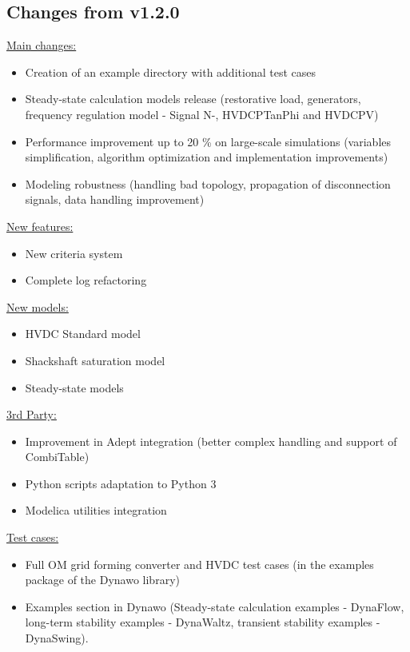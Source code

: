 \documentclass[a4paper, 12pt]{report}
\begin{document}
\subsection{Changes from v1.2.0}

\underline{Main changes:}
\begin{itemize}
\item Creation of an example directory with additional test cases
\item Steady-state calculation models release (restorative load, generators, frequency regulation model - Signal N-, HVDCPTanPhi and HVDCPV)
\item Performance improvement up to 20 \% on large-scale simulations (variables simplification, algorithm optimization and implementation improvements)
\item Modeling robustness (handling bad topology, propagation of disconnection signals, data handling improvement)
\end{itemize}

\underline{New features:}
\begin{itemize}
\item New criteria system
\item Complete log refactoring
\end{itemize}

\underline{New models:}
\begin{itemize}
\item HVDC Standard model
\item Shackshaft saturation model
\item Steady-state models
\end{itemize}

\underline{3rd Party:}
\begin{itemize}
\item Improvement in Adept integration (better complex handling and support of CombiTable)
\item Python scripts adaptation to Python 3
\item Modelica utilities integration
\end{itemize}

\underline{Test cases:}
\begin{itemize}
\item Full OM grid forming converter and HVDC test cases (in the examples package of the Dynawo library)
\item Examples section in Dynawo (Steady-state calculation examples - DynaFlow, long-term stability examples - DynaWaltz, transient stability examples - DynaSwing).
\end{itemize}
\end{document}
